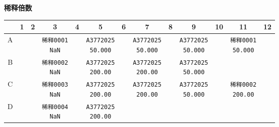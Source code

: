 \documentclass[UTF8,10pt,a4paper,fontset=fandol]{ctexart}
\newcommand{\fieldvalue}[1]{#1}
\begin{document}
\textbf{稀释倍数}

\begin{center}
\small
\begin{tabular}{c|*{12}{c|}}
 &1&2&3&4&5&6&7&8&9&10&11&12\\ \hline
A&&&
\fieldvalue{\texttt{稀释0001\\NaN}}&&
\fieldvalue{\texttt{A3772025\\50.000}}&&
\fieldvalue{\texttt{A3772025\\50.000}}&&
\fieldvalue{\texttt{A3772025\\50.000}}&&
\fieldvalue{\texttt{稀释0001\\50.000}}\\ \hline
B&&&
\fieldvalue{\texttt{稀释0002\\NaN}}&&
\fieldvalue{\texttt{A3772025\\200.00}}&&
\fieldvalue{\texttt{A3772025\\200.00}}&&
\fieldvalue{\texttt{A3772025\\50.000}}&&&&\\ \hline
C&&&
\fieldvalue{\texttt{稀释0003\\NaN}}&&
\fieldvalue{\texttt{A3772025\\200.00}}&&
\fieldvalue{\texttt{A3772025\\200.00}}&&
\fieldvalue{\texttt{A3772025\\50.000}}&&
\fieldvalue{\texttt{稀释0002\\200.00}}\\ \hline
D&&&
\fieldvalue{\texttt{稀释0004\\NaN}}&&
\fieldvalue{\texttt{A3772025\\200.00}}&&

\end{tabular}
\end{center}
\end{document}
